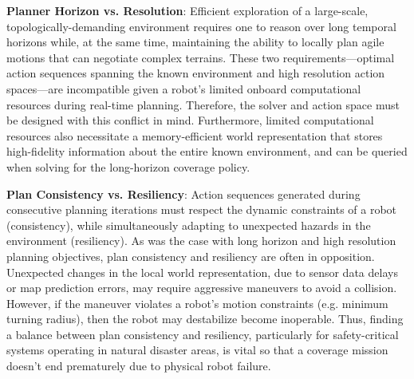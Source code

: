 \documentclass[letterpaper]{article} %
\newcommand{\ph}[1]{{\textbf{#1}:}} %
\begin{document}
\ph{Planner Horizon vs. Resolution}
 Efficient exploration of a large-scale, topologically-demanding environment requires one to reason over long temporal horizons while, at the same time, maintaining the ability to locally plan agile motions that can negotiate complex terrains. These two requirements---optimal action sequences spanning the known environment and high resolution action spaces---are incompatible given a robot's limited onboard computational resources during real-time planning. Therefore, the solver and action space must be designed with this conflict in mind. Furthermore, limited computational resources also necessitate a memory-efficient world representation that stores high-fidelity information about the entire known environment, and can be queried when solving for the long-horizon coverage policy. 
 
\ph{Plan Consistency vs. Resiliency}
Action sequences generated during consecutive planning iterations must respect the dynamic constraints of a robot (consistency), while simultaneously adapting to unexpected hazards in the environment (resiliency). As was the case with long horizon and high resolution planning objectives, plan consistency and resiliency are often in opposition. Unexpected changes in the local world representation, due to sensor data delays or map prediction errors, may require aggressive maneuvers to avoid a collision. However, if the maneuver violates a robot's motion constraints (e.g. minimum turning radius), then the robot may destabilize become inoperable. Thus, finding a balance between plan consistency and resiliency, particularly for safety-critical systems operating in natural disaster areas, is vital so that a coverage mission doesn't end prematurely due to physical robot failure. 





\end{document}
